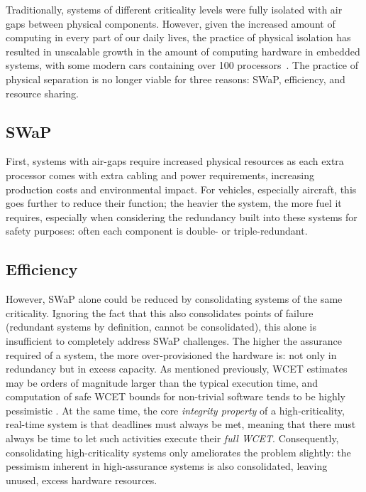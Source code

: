 Traditionally, systems of different criticality levels were fully isolated with
air gaps between physical components. However, given the increased amount of
computing in every part of our daily lives, the practice of physical isolation
has resulted in unscalable growth in the amount of computing hardware in
embedded systems, with some modern cars containing over 100
processors~\citep{Hergenhan_Heiser_08}. The practice of physical separation is no 
longer viable for three reasons: \gls{SWaP}, efficiency, and resource sharing.

\subsection{SWaP}

First, systems with air-gaps require increased physical
resources as each extra processor comes with extra cabling and power requirements,
increasing production costs and environmental impact.
For vehicles, especially aircraft, this goes further to reduce their function; the
heavier the system, the more fuel it requires, especially when considering 
the redundancy built into these systems for safety purposes: often each component is double- or
triple-redundant. 

\subsection{Efficiency} 

However, \gls{SWaP} alone could be reduced by consolidating systems of the same
criticality. Ignoring the fact that this also consolidates points of failure (redundant systems by
definition, cannot be consolidated), this alone is insufficient to completely address \gls{SWaP}
challenges. The higher the assurance required of a system, the more over-provisioned the hardware is: not only in
redundancy but in excess capacity. As mentioned previously, \gls{WCET}
estimates may be orders of magnitude larger than the typical execution time, and
computation of safe \gls{WCET} bounds for non-trivial software tends to be highly pessimistic
\citep{Wilhelm_EEHTWBFHMMPPSS_08}. At the same time, the core \emph{integrity property} of a
high-criticality, real-time system is that deadlines must always be
met, meaning that there must always be time to let such activities execute their \emph{full \gls{WCET}}.
Consequently, consolidating high-criticality
systems only ameliorates the problem slightly: the pessimism inherent in high-assurance systems is
also consolidated, leaving unused, excess hardware resources.

